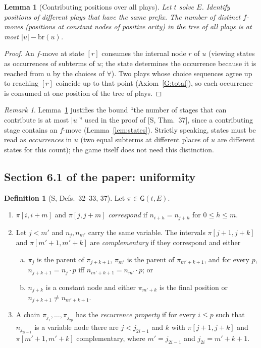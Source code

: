 \documentclass[11pt]{article}
\newcommand{\br}{\mathrm{br}}
\newcommand{\Gm}{\mathsf{G}}
\newcommand{\suc}[2]{#1{\cdot}#2}
\newcommand{\iv}[2]{\pi[#1,#2]}
\theoremstyle{plain}
\newtheorem{lemma}[theorem]{Lemma}
\theoremstyle{definition}
\newtheorem{definition}[theorem]{Definition}
\theoremstyle{remark}
\newtheorem{remark}[theorem]{Remark}
\begin{document}
\begin{lemma}[Contributing positions over all plays]\label{lem:global-contrib}
Let $t$ solve $E$.  Identify positions of different plays that have the
same prefix.  The number of distinct $f$-moves (positions at constant
nodes of positive arity) in the tree of all plays is at most
$|u|-\br(u)$.
\end{lemma}
\begin{proof}
An $f$-move at state $[r]$ consumes the internal node $r$ of $u$
(viewing states as occurrences of subterms of $u$; the state determines
the occurrence because it is reached from $u$ by the choices of
$\forall$).  Two plays whose choice sequences agree up to reaching $[r]$
coincide up to that point (Axiom~\ref{G:total}), so each occurrence is
consumed at one position of the tree of plays.
\end{proof}

\begin{remark}
Lemma~\ref{lem:global-contrib} justifies the bound ``the number of
stages that can contribute is at most $|u|$'' used in the proof of
[S, Thm.~37], since a contributing stage contains an $f$-move
(Lemma~\ref{lem:states}).  Strictly speaking, states must be read as
\emph{occurrences} in $u$ (two equal subterms at different places of
$u$ are different states for this count); the game itself does not
need this distinction.
\end{remark}

\subsection{Section 6.1 of the paper: uniformity}

\begin{definition}[S, Defs.~32--33, 37]\label{def:corr}
Let $\pi\in\Gm(t,E)$.
\begin{enumerate}
\item $\iv i{i+m}$ and $\iv j{j+m}$ \emph{correspond} if
  $n_{i+h}=n_{j+h}$ for $0\le h\le m$.
\item Let $j<m'$ and $n_j,n_{m'}$ carry the same variable.  The intervals
  $\iv{j+1}{j+k}$ and $\iv{m'+1}{m'+k}$ are \emph{complementary} if they
  correspond and either
  \begin{enumerate}[(a)]
  \item $\pi_j$ is the parent of $\pi_{j+k+1}$, $\pi_{m'}$ is the parent of
    $\pi_{m'+k+1}$, and for every $p$, $n_{j+k+1}=\suc{n_j}p$ iff
    $n_{m'+k+1}=\suc{n_{m'}}p$; or
  \item $n_{j+k}$ is a constant node and either $\pi_{m'+k}$ is the
    final position or $n_{j+k+1}\ne n_{m'+k+1}$.
  \end{enumerate}
\item A chain $\pi_{j_1},\dots,\pi_{j_{2p}}$ has the \emph{recurrence
  property} if for every $i\le p$ such that $n_{j_{2i-1}}$ is a variable
  node there are $j<j_{2i-1}$ and $k$ with $\iv{j+1}{j+k}$ and
  $\iv{m'+1}{m'+k}$ complementary, where $m'=j_{2i-1}$ and
  $j_{2i}=m'+k+1$.
\end{enumerate}
\end{definition}
\end{document}
